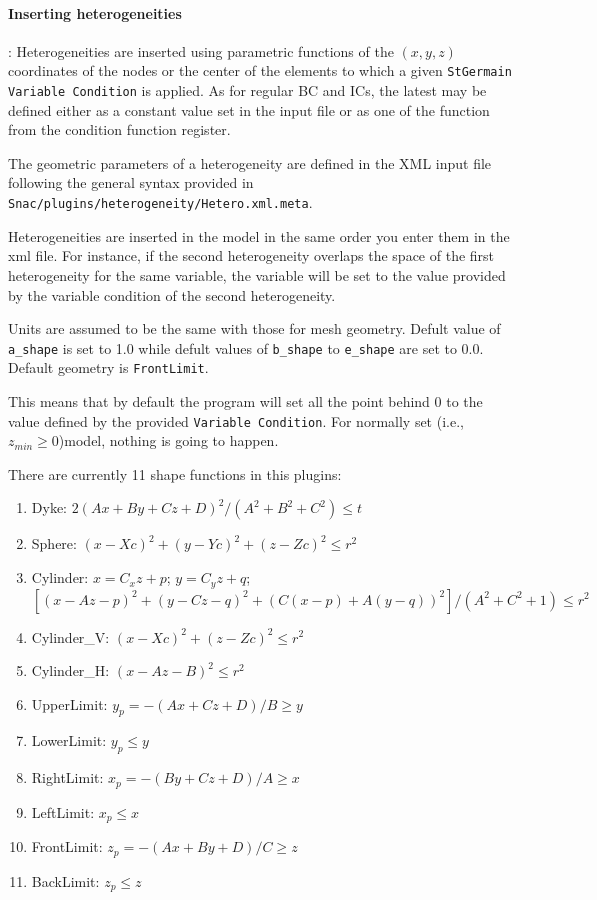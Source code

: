 \documentclass[letterpaper,11pt]{article}
\begin{document}
\paragraph{Inserting heterogeneities}:
Heterogeneities are inserted using parametric functions of the $(x,y,z)$
coordinates of the nodes or the center of the elements to which a
given \texttt{StGermain Variable Condition} is applied. As for regular
BC and ICs, the latest may be defined either as a constant value set
in the input file or as one of the function from the condition
function register.

The geometric parameters of a heterogeneity are defined in the XML
input file following the general syntax provided in\\
\texttt{Snac/plugins/heterogeneity/Hetero.xml.meta}.

Heterogeneities are inserted in the model in the same order you enter
them in the xml file. For instance, if the second heterogeneity
overlaps the space of the first heterogeneity for the same variable,
the variable will be set to the value provided by the variable
condition of the second heterogeneity.

Units are assumed to be the same with those for mesh geometry.
Defult value of \texttt{a\_shape} is set to 1.0 while defult values
of \texttt{b\_shape} to \texttt{e\_shape} are set to 0.0. Default
geometry is \texttt{FrontLimit}.

This means that by default the program will set all the point behind
$0$ to the value defined by the provided \texttt{Variable Condition}.
For normally set (i.e., $z_{min}\ge0$)model, nothing is going to happen.

There are currently 11 shape functions in this plugins:
\begin{enumerate}
\item Dyke: $2(Ax+By+Cz+D)^{2}/(A^2+B^2+C^2) \le t$
\item Sphere: $(x-Xc)^2+(y-Yc)^2+(z-Zc)^2 \le r^2$
\item Cylinder: $x=C_x z+p$; $y=C_y z+q$;
  $[(x-Az-p)^2+(y-Cz-q)^2+(C(x-p)+A(y-q))^2]/(A^2+C^2+1) \le r^2$
\item Cylinder\_V: $(x-Xc)^2+(z-Zc)^2 \le r^2$
\item Cylinder\_H: $(x-Az-B)^2 \le r^2$
\item UpperLimit: $y_p=-(Ax+Cz+D)/B \ge y$
\item LowerLimit: $y_p \le y$
\item RightLimit: $x_p=-(By+Cz+D)/A \ge x$
\item LeftLimit: $x_p \le x$
\item FrontLimit: $z_p=-(Ax+By+D)/C \ge z$
\item BackLimit: $z_p \le z$
\end{enumerate}
\end{document}
